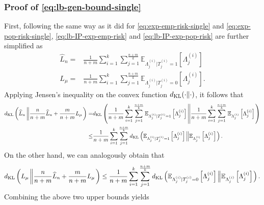 \documentclass[onecolumn,romanappendices,10pt]{IEEEtran}
\newcommand{\EE}{{\mathbb{E}}}
\begin{document}
	\subsubsection{Proof of \eqref{eq:lb-gen-bound-single}}
	First, following the same way as it did for \eqref{eq:exp-emp-risk-single} and \eqref{eq:exp-pop-risk-single}, \eqref{eq:lb-IP-exp-emp-risk} and \eqref{eq:lb-IP-exp-pop-risk} are further simplified as
	\begin{align}
		\widehat{L}_n =& \frac{1}{n+m} \sum_{i=1}^k \sum_{j=1}^{\frac{n+m}{k}} \EE_{\Lambda^{(i)}_j | T^{(i)}_j = 1} \left[ \Lambda^{(i)}_j \right] \\
		L_\mu =& \frac{1}{n+m} \sum_{i=1}^k \sum_{j=1}^{\frac{n+m}{k}} \EE_{\Lambda^{(i)}_j | T^{(i)}_j = 0} \left[ \Lambda^{(i)}_j \right].
	\end{align}
	Applying Jensen's inequality on the convex function $d_{\textnormal{KL}}(\cdot \| \cdot)$, it follows that
	\begin{equation}
		\begin{aligned}
			d_{\textnormal{KL}} \left(\widehat{L}_n \left\| \frac{n}{n+m} \widehat{L}_n + \frac{m}{n+m} L_\mu \right.\right) =& d_{\textnormal{KL}} \left(\frac{1}{n+m} \sum_{i=1}^k \sum_{j=1}^{\frac{n+m}{k}} \EE_{\Lambda^{(i)}_j | T^{(i)}_j = 1} \left[ \Lambda^{(i)}_j \right] \left\| \frac{1}{n+m} \sum_{i=1}^k \sum_{j=1}^{\frac{n+m}{k}} \EE_{\Lambda^{(i)}_j} \left[ \Lambda^{(i)}_j \right] \right.\right) \\
			\leq& \frac{1}{n+m} \sum_{i=1}^k \sum_{j=1}^{\frac{n+m}{k}} d_{\textnormal{KL}} \left(\EE_{\Lambda^{(i)}_j | T^{(i)}_j = 1} \left[ \Lambda^{(i)}_j \right] \left\| \EE_{\Lambda^{(i)}_j} \left[ \Lambda^{(i)}_j \right] \right.\right).
		\end{aligned}
	\end{equation}
	On the other hand, we can analogously obtain that
	\begin{equation}
		\begin{aligned}
			d_{\textnormal{KL}} \left(L_\mu \left\| \frac{n}{n+m} \widehat{L}_n + \frac{m}{n+m} L_\mu \right.\right) \leq \frac{1}{n+m} \sum_{i=1}^k \sum_{j=1}^{\frac{n+m}{k}} d_{\textnormal{KL}} \left(\EE_{\Lambda^{(i)}_j | T^{(i)}_j = 0} \left[ \Lambda^{(i)}_j \right] \left\| \EE_{\Lambda^{(i)}_j} \left[ \Lambda^{(i)}_j \right] \right.\right).
		\end{aligned}
	\end{equation}
	Combining the above two upper bounds yields
\end{document}
